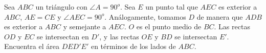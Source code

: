 Sea $ABC$ un triángulo con $\angle A = 90^o$. Sea $E$ un punto tal que $AEC$ es exterior a $ABC$, $AE = CE$ y $\angle AEC = 90^o$. Análogamente, tomamos $D$ de manera que $ADB$ es exterior a $ABC$ y semejante a $AEC$. $O$ es el punto medio de $BC$. Las rectas $OD$ y $EC$ se intersectan en $D'$, y las rectas $OE$ y $BD$ se intersectan $E'$. Encuentra el área $DED'E'$ en términos de los lados de $ABC$. 